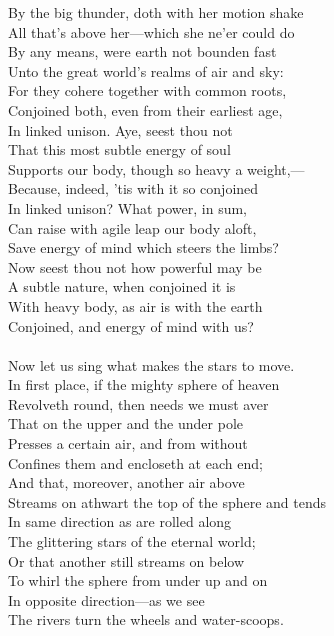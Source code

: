 By the big thunder, doth with her motion shake\\
All that's above her—which she ne'er could do\\
By any means, were earth not bounden fast\\
Unto the great world's realms of air and sky:\\
For they cohere together with common roots,\\
Conjoined both, even from their earliest age,\\
In linked unison. Aye, seest thou not\\
That this most subtle energy of soul\\
Supports our body, though so heavy a weight,—\\
Because, indeed, 'tis with it so conjoined\\
In linked unison? What power, in sum,\\
Can raise with agile leap our body aloft,\\
Save energy of mind which steers the limbs?\\
Now seest thou not how powerful may be\\
A subtle nature, when conjoined it is\\
With heavy body, as air is with the earth\\
Conjoined, and energy of mind with us?\\
\\
Now let us sing what makes the stars to move.\\
In first place, if the mighty sphere of heaven\\
Revolveth round, then needs we must aver\\
That on the upper and the under pole\\
Presses a certain air, and from without\\
Confines them and encloseth at each end;\\
And that, moreover, another air above\\
Streams on athwart the top of the sphere and tends\\
In same direction as are rolled along\\
The glittering stars of the eternal world;\\
Or that another still streams on below\\
To whirl the sphere from under up and on\\
In opposite direction—as we see\\
The rivers turn the wheels and water-scoops.\\
